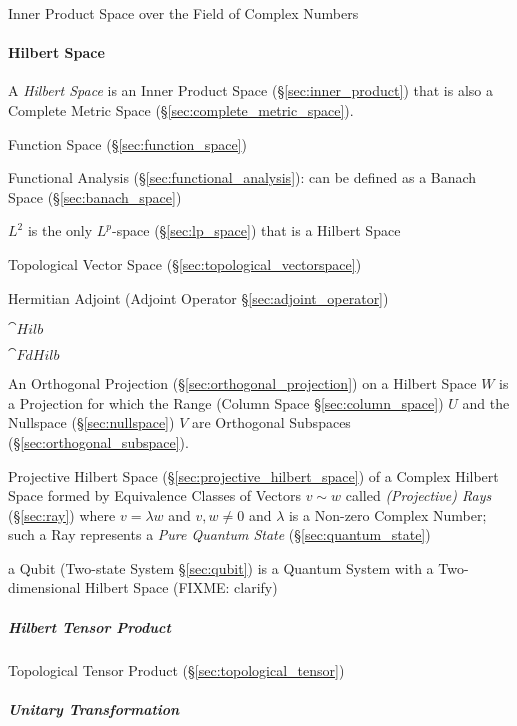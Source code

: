 Inner Product Space over the Field of Complex Numbers



\paragraph{Hilbert Space}\label{sec:hilbert_space}\hfill


A \emph{Hilbert Space} is an Inner Product Space (\S\ref{sec:inner_product})
that is also a Complete Metric Space (\S\ref{sec:complete_metric_space}).

Function Space (\S\ref{sec:function_space})

Functional Analysis (\S\ref{sec:functional_analysis}): can be defined as a
Banach Space (\S\ref{sec:banach_space})

$L^2$ is the only $L^p$-space (\S\ref{sec:lp_space}) that is a Hilbert Space

Topological Vector Space (\S\ref{sec:topological_vectorspace})

Hermitian Adjoint (Adjoint Operator \S\ref{sec:adjoint_operator})

$\cat{Hilb}$

$\cat{FdHilb}$

An Orthogonal Projection (\S\ref{sec:orthogonal_projection}) on a Hilbert Space
$W$ is a Projection for which the Range (Column Space \S\ref{sec:column_space})
$U$ and the Nullspace (\S\ref{sec:nullspace}) $V$ are Orthogonal Subspaces
(\S\ref{sec:orthogonal_subspace}).

\fist Projective Hilbert Space (\S\ref{sec:projective_hilbert_space}) of a
Complex Hilbert Space formed by Equivalence Classes of Vectors $v \sim w$ called
\emph{(Projective) Rays} (\S\ref{sec:ray}) where $v = \lambda w$ and $v, w \neq
0$ and $\lambda$ is a Non-zero Complex Number; such a Ray represents a
\emph{Pure Quantum State} (\S\ref{sec:quantum_state})

\fist a Qubit (Two-state System \S\ref{sec:qubit}) is a Quantum System with a
Two-dimensional Hilbert Space (FIXME: clarify)



\subparagraph{Hilbert Tensor Product}\label{sec:hilbert_tensor}\hfill

Topological Tensor Product (\S\ref{sec:topological_tensor})



\subparagraph{Unitary Transformation}\label{sec:unitary_transformation}\hfill

